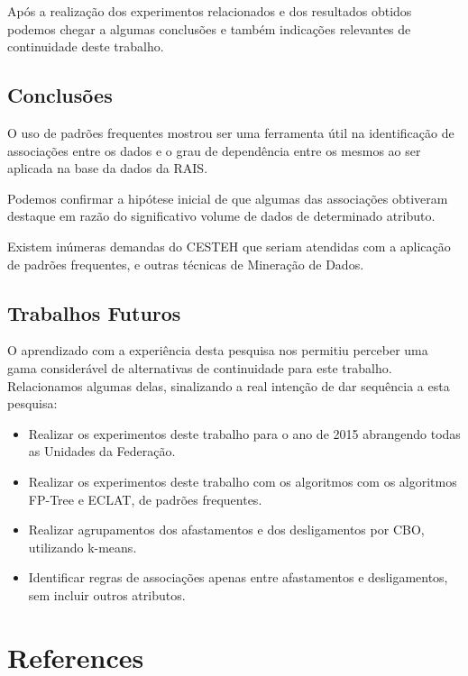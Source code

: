 \documentclass[12pt]{article}
\begin{document}
Após a realização dos experimentos relacionados e dos resultados obtidos podemos chegar a algumas conclusões e também indicações relevantes de continuidade deste trabalho.

\subsection{Conclusões}

O uso de padrões frequentes  mostrou ser uma ferramenta útil na identificação de associações entre os dados  e o grau de dependência entre os mesmos ao ser aplicada na base da dados da RAIS.  

Podemos confirmar a hipótese inicial de que algumas das associações obtiveram destaque em razão do significativo  volume de dados de determinado atributo.

Existem inúmeras demandas do CESTEH que seriam atendidas com a aplicação de padrões frequentes, e outras técnicas de Mineração de Dados. 


\subsection{Trabalhos Futuros}

O aprendizado com a experiência desta pesquisa nos permitiu perceber uma gama considerável de alternativas de continuidade para este trabalho.
Relacionamos algumas delas, sinalizando a real intenção de dar sequência a esta pesquisa:

\begin{itemize}
    \item Realizar os experimentos deste trabalho para o ano de 2015 abrangendo todas as Unidades da Federação.
    \item Realizar os experimentos deste trabalho com os algoritmos com os algoritmos FP-Tree e ECLAT, de padrões frequentes. 
    \item Realizar agrupamentos dos afastamentos e dos desligamentos por CBO, utilizando k-means.
    \item Identificar regras de associações apenas entre afastamentos e desligamentos, sem incluir outros atributos.
    
\end{itemize}

\section{References}




\end{document}

